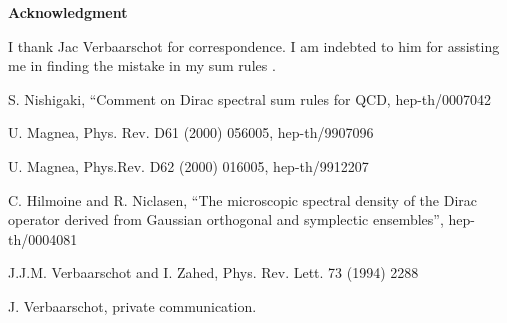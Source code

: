 \documentclass[a4paper,10pt]{article}
\begin{document}
{\bf Acknowledgment}

I thank Jac Verbaarschot for correspondence. I am indebted to him for
assisting me in finding the mistake in my sum rules \cite{Jac}. 



\begin{thebibliography}{99}


 S. Nishigaki, ``Comment on Dirac spectral sum rules for 
QCD\coordHE{}, hep-th/0007042

 U. Magnea, Phys. Rev. D61 (2000) 056005, hep-th/9907096 

 U. Magnea, Phys.Rev. D62 (2000) 016005, hep-th/9912207

 C. Hilmoine and R. Niclasen, ``The microscopic spectral 
density of the Dirac operator derived from Gaussian orthogonal and symplectic 
ensembles'', hep-th/0004081



 J.J.M. Verbaarschot and I. Zahed, Phys. Rev. Lett. 73 (1994) 2288

 J. Verbaarschot, private communication. 

\end{thebibliography}
\end{document}
